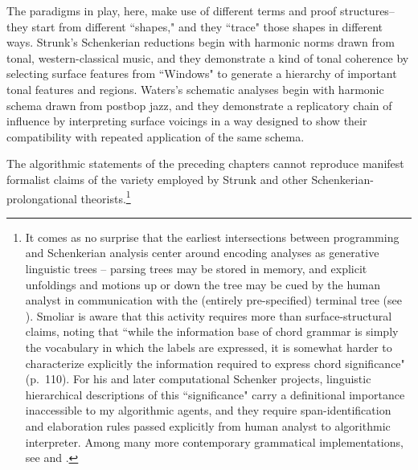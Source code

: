 The paradigms in play, here, make use of different terms and proof structures-- they start from different ``shapes," and they ``trace" those shapes in different ways.  Strunk's Schenkerian reductions begin with harmonic norms drawn from tonal, western-classical music, and they demonstrate a kind of tonal coherence by selecting surface features from ``Windows" to generate a hierarchy of important tonal features and regions.  Waters's schematic analyses begin with harmonic schema drawn from postbop jazz, and they demonstrate a replicatory chain of influence by interpreting surface voicings in a way designed to show their compatibility with repeated application of the same schema.

The algorithmic statements of the preceding chapters cannot reproduce manifest formalist claims of the variety employed by Strunk and other Schenkerian-prolongational theorists.\footnote{It comes as no surprise that the earliest intersections between programming and Schenkerian analysis center around encoding analyses as generative linguistic trees -- parsing trees may be stored in memory, and explicit unfoldings and motions up or down the tree may be cued by the human analyst in communication with the (entirely pre-specified) terminal tree (see \cite{smoliar1979}).  Smoliar is aware that this activity requires more than surface-structural claims, noting that ``while the information base of chord grammar is simply the vocabulary in which the labels are expressed, it is somewhat harder to characterize explicitly the information required to express chord significance" (p.\ 110).  For his and later computational Schenker projects, linguistic hierarchical descriptions of this ``significance" carry a definitional importance inaccessible to my algorithmic agents, and they require span-identification and elaboration rules passed explicitly from human analyst to algorithmic interpreter.  Among many more contemporary grammatical implementations, see \cite{mavromatis2004} and \cite{marsden2010}.}
